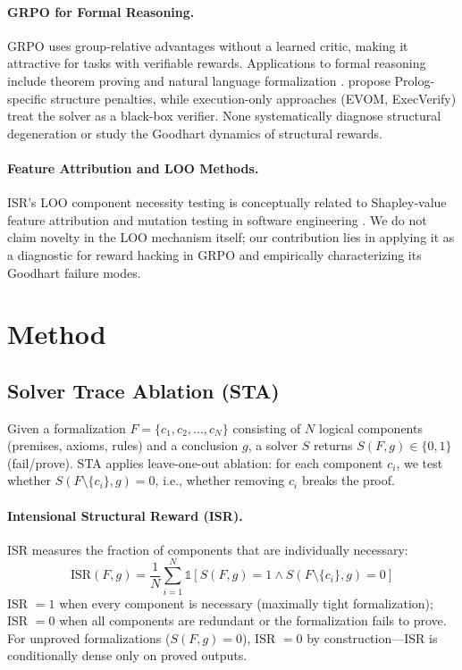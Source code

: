 \documentclass[11pt,a4paper]{article}
\begin{document}
\paragraph{GRPO for Formal Reasoning.}
GRPO \cite{shao2024deepseekmath} uses group-relative advantages without a learned critic, making it attractive for tasks with verifiable rewards.
Applications to formal reasoning include theorem proving \cite{polu2020generative, yang2024leandojo, first2023baldur} and natural language formalization \cite{han2022folio, olausson2023linc}.
\citet{mellgren2025operationalizing} propose Prolog-specific structure penalties, while execution-only approaches (EVOM, ExecVerify) treat the solver as a black-box verifier.
None systematically diagnose structural degeneration or study the Goodhart dynamics of structural rewards.

\paragraph{Feature Attribution and LOO Methods.}
ISR's LOO component necessity testing is conceptually related to Shapley-value feature attribution \cite{lundberg2017unified} and mutation testing in software engineering \cite{jia2011analysis}.
We do not claim novelty in the LOO mechanism itself; our contribution lies in applying it as a diagnostic for reward hacking in GRPO and empirically characterizing its Goodhart failure modes.

\section{Method}
\label{sec:method}

\subsection{Solver Trace Ablation (STA)}

Given a formalization $F = \{c_1, c_2, \ldots, c_N\}$ consisting of $N$ logical components (premises, axioms, rules) and a conclusion $g$, a solver $S$ returns $S(F, g) \in \{0, 1\}$ (fail/prove).
STA applies leave-one-out ablation: for each component $c_i$, we test whether $S(F \setminus \{c_i\}, g) = 0$, i.e., whether removing $c_i$ breaks the proof.

\paragraph{Intensional Structural Reward (ISR).}
ISR measures the fraction of components that are individually necessary:
\begin{equation}
\text{ISR}(F, g) = \frac{1}{N} \sum_{i=1}^{N} \mathbb{1}\left[S(F, g) = 1 \wedge S(F \setminus \{c_i\}, g) = 0\right]
\label{eq:isr}
\end{equation}
ISR $= 1$ when every component is necessary (maximally tight formalization); ISR $= 0$ when all components are redundant or the formalization fails to prove.
For unproved formalizations ($S(F, g) = 0$), ISR $= 0$ by construction---ISR is conditionally dense only on proved outputs.
\end{document}
